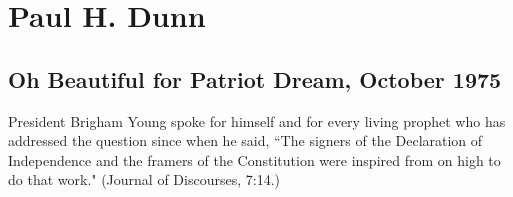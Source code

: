 \section{Paul H. Dunn}

\subsection{Oh Beautiful for Patriot Dream, October 1975}

President Brigham Young spoke for himself and for every living prophet who has addressed the question since when he said, ``The signers of the Declaration of Independence and the framers of the Constitution were inspired from on high to do that work." (Journal of Discourses, 7:14.)